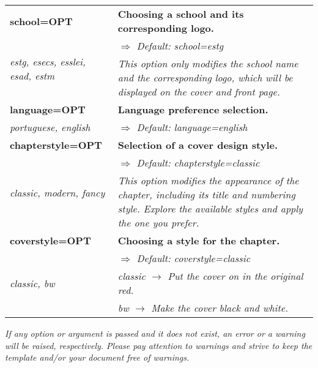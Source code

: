 {\begin{table}[!htpb]
\begin{tabularx}{\textwidth}{lX}
        \textbf{school=OPT} & \textbf{Choosing a school and its corresponding logo.} \\
        \multirow[t]{2}{*}{\footnotesize{\textit{estg, esecs, esslei, esad, estm}}} & \footnotesize{\textit{$\Rightarrow$ Default: school=estg}} \\
        & \footnotesize{\textit{This option only modifies the school name and the corresponding logo, which will be displayed on the cover and front page.}} \\[1.70em]
        
        \textbf{language=OPT} & \textbf{Language preference selection.} \\
        \footnotesize{\textit{portuguese, english}} & \footnotesize{\textit{$\Rightarrow$ Default: language=english}} \\[0.85em]
        
        \textbf{chapterstyle=OPT} & \textbf{Selection of a cover design style.} \\
        \multirow[t]{2}{*}{\footnotesize{\textit{classic, modern, fancy}}} & \footnotesize{\textit{$\Rightarrow$ Default: chapterstyle=classic}} \\
        & \footnotesize{\textit{This option modifies the appearance of the chapter, including its title and numbering style. Explore the available styles and apply the one you prefer.}} \\[1.70em]
        
        \textbf{coverstyle=OPT} & \textbf{Choosing a style for the chapter.} \\
        \multirow[t]{3}{*}{\footnotesize{\textit{classic, bw}}} & \footnotesize{\textit{$\Rightarrow$ Default: coverstyle=classic}} \\
        & \footnotesize{\textit{classic $\rightarrow$ Put the cover on in the original red.}} \\
        & \footnotesize{\textit{bw $\rightarrow$ Make the cover black and white.}} \\
        \bottomrule
    \end{tabularx}
\end{table}

\begin{block}[warning]
\textit{If any option or argument is passed and it does not exist, an error or a warning will be raised, respectively. Please pay attention to warnings and strive to keep the template and/or your document free of warnings.}
\end{block}

}
